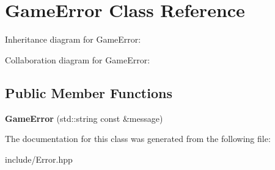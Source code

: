 \hypertarget{class_game_error}{}\section{Game\+Error Class Reference}
\label{class_game_error}


Inheritance diagram for Game\+Error\+:


Collaboration diagram for Game\+Error\+:
\subsection*{Public Member Functions}
\begin{DoxyCompactItemize}
\item 
\mbox{\label{class_game_error_a3fc0ab66959e8366fb48f4ef236446a6}} 
{\bfseries Game\+Error} (std\+::string const \&message)
\end{DoxyCompactItemize}


The documentation for this class was generated from the following file\+:\begin{DoxyCompactItemize}
\item 
include/Error.\+hpp\end{DoxyCompactItemize}
